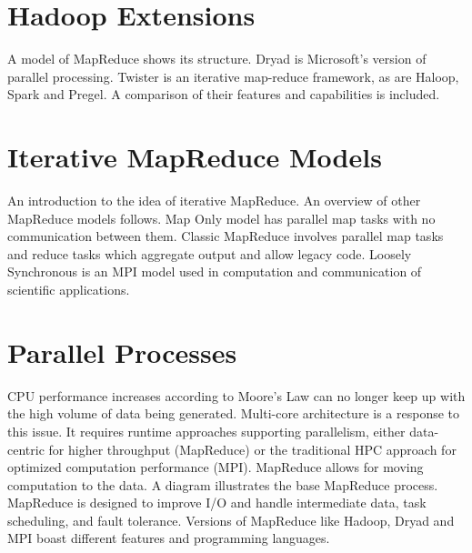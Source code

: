 


\section{Hadoop Extensions}

A model of MapReduce shows its structure. Dryad is Microsoft's version
of parallel processing. Twister is an iterative map-reduce framework, as
are Haloop, Spark and Pregel. A comparison of their features and
capabilities is included.



\section{Iterative MapReduce Models}

An introduction to the idea of iterative MapReduce. An overview of other
MapReduce models follows. Map Only model has parallel map tasks with no
communication between them. Classic MapReduce involves parallel map
tasks and reduce tasks which aggregate output and allow legacy code.
Loosely Synchronous is an MPI model used in computation and
communication of scientific applications.




\section{Parallel Processes}

CPU performance increases according to Moore's Law can no longer keep up
with the high volume of data being generated. Multi-core architecture is
a response to this issue. It requires runtime approaches supporting
parallelism, either data-centric for higher throughput (MapReduce) or
the traditional HPC approach for optimized computation performance
(MPI). MapReduce allows for moving computation to the data. A diagram
illustrates the base MapReduce process. MapReduce is designed to improve
I/O and handle intermediate data, task scheduling, and fault tolerance.
Versions of MapReduce like Hadoop, Dryad and MPI boast different
features and programming languages.

